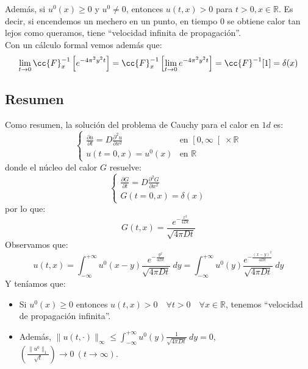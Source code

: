 \begin{description}
        Además, si $u^0(x)\geq 0$ y $u^0\neq 0$, entonces $u(t,x)>0$ para $t>0, x\in \mathbb{R}$. Es decir, si encendemos un mechero en un punto, en tiempo 0 se obtiene calor tan lejos como queramos, tiene  ``velocidad infinita de propagación''.\\

        Con un cálculo formal vemos además que:
        \begin{equation*}
            \lim_{t\to0}\cc{F}^{-1}_x\left[e^{-4\pi^2y^2t}\right] = \cc{F}^{-1}_x\left[\lim_{t\to0} e^{-4\pi^2y^2t}\right] = \cc{F}^{-1}[1] = \delta(x)
        \end{equation*}
\end{description}

\subsection{Resumen}
\noindent
Como resumen, la solución del problema de Cauchy para el calor en $1d$ es:
\begin{equation*}
    \left\{\begin{array}{ll}
            \displaystyle \frac{\partial u}{\partial t} = D\frac{\partial^2 u}{\partial x^2} & \text{en\ } \left[0,\infty\right[\times \mathbb{R} \\
                u(t=0,x) = u^0(x) & \text{en\ } \mathbb{R}
    \end{array}\right.
\end{equation*}
donde el núcleo del calor $G$ resuelve:
\begin{equation*}
    \left\{\begin{array}{l}
        \displaystyle \frac{\partial G}{\partial t} = D\frac{\partial^2 G}{\partial x^2} \\
        G(t=0,x) = \delta(x)
    \end{array}\right.
\end{equation*}
por lo que:
\begin{equation*}
    G(t,x) = \frac{e^{-\frac{x^2}{4Dt}}}{\sqrt{4\pi Dt}}
\end{equation*}
Observamos que:
\begin{equation*}
    u(t,x) = \int_{-\infty}^{+\infty} u^0(x-y)\frac{e^{-\frac{y^2}{4Dt}}}{\sqrt{4\pi Dt}}~dy  = \int_{-\infty}^{+\infty} u^0(y) \frac{e^{-\frac{{(x-y)}^{2}}{4Dt}}}{\sqrt{4\pi Dt}}~dy
\end{equation*}
Y teníamos que:
\begin{itemize}
    \item Si $u^0(x)\geq 0$ entonces $u(t,x) > 0\quad \forall t>0\quad \forall x\in \mathbb{R}$, tenemos ``velocidad de propagación infinita''.
    \item Además, $\displaystyle\|u(t,\cdot )\|_\infty\leq \int_{-\infty}^{+\infty} u^0(y)\frac{1}{\sqrt{4\pi Dt}}~dy =0$, $\left(\frac{\|u^0\|_1}{\sqrt{t}}\right)\to 0\ (t\to\infty)$.
\end{itemize}
